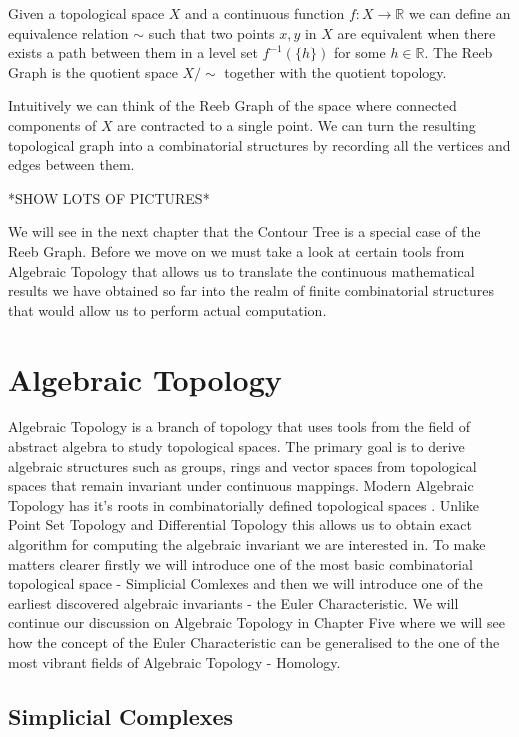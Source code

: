 \begin{defn}
Given a topological space $X$ and a continuous function $f: X \to \mathbb{R}$ we can define an equivalence relation $\sim$ such that two points $x, y$ in $X$ are equivalent when there exists a path between them in a level set $f^{-1}(\{h\})$ for some $h \in \mathbb{R}$. The Reeb Graph is the quotient space $X \big/ \sim$ together with the quotient topology.
\end{defn}

Intuitively we can think of the Reeb Graph of the space where connected components of $X$ are contracted to a single point. We can turn the resulting topological graph into a combinatorial structures by recording all the vertices and edges between them.

*SHOW LOTS OF PICTURES*

We will see in the next chapter that the Contour Tree is a special case of the Reeb Graph. Before we move on we must take a look at certain tools from Algebraic Topology that allows us to translate the continuous mathematical results we have obtained so far into the realm of finite combinatorial structures that would allow us to perform actual computation.

\section{Algebraic Topology}

Algebraic Topology is a branch of topology that uses tools from the field of abstract algebra to study topological spaces. The primary goal is to derive algebraic structures such as groups, rings and vector spaces from topological spaces that remain invariant under continuous mappings. Modern Algebraic Topology has it's roots in combinatorially defined topological spaces \cite{comb-alg-topo}. Unlike Point Set Topology and Differential Topology this allows us to obtain exact algorithm for computing the algebraic invariant we are interested in. To make matters clearer firstly we will introduce one of the most basic combinatorial topological space - Simplicial Comlexes and then we will introduce one of the earliest discovered algebraic invariants - the Euler Characteristic. We will continue our discussion on Algebraic Topology in Chapter Five where we will see how the concept of the Euler Characteristic can be generalised to the one of the most vibrant fields of Algebraic Topology - Homology.

\subsection{Simplicial Complexes}

